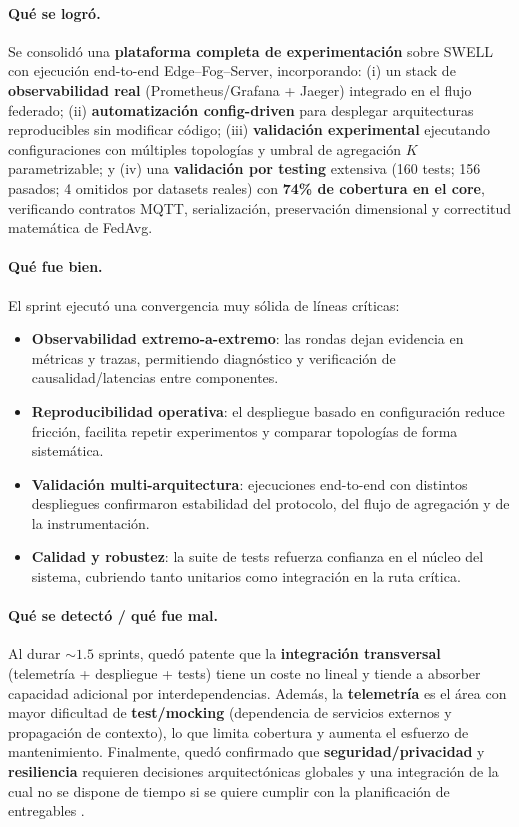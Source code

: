 \documentclass{report}
\begin{document}
\vspace{0.15em}
\paragraph{Qué se logró.}
Se consolidó una \textbf{plataforma completa de experimentación} sobre SWELL con ejecución end-to-end Edge--Fog--Server, incorporando:
(i) un stack de \textbf{observabilidad real} (Prometheus/Grafana + Jaeger) integrado en el flujo federado;
(ii) \textbf{automatización config-driven} para desplegar arquitecturas reproducibles sin modificar código;
(iii) \textbf{validación experimental} ejecutando configuraciones con múltiples topologías y umbral de agregación $K$ parametrizable; y
(iv) una \textbf{validación por testing} extensiva (160 tests; 156 pasados; 4 omitidos por datasets reales) con \textbf{74\% de cobertura en el core}, verificando contratos MQTT, serialización, preservación dimensional y correctitud matemática de FedAvg.

\vspace{0.15em}
\paragraph{Qué fue bien.}
El sprint ejecutó una convergencia muy sólida de líneas críticas:
\begin{itemize}\setlength\itemsep{0.25em}
  \item \textbf{Observabilidad extremo-a-extremo}: las rondas dejan evidencia en métricas y trazas, permitiendo diagnóstico y verificación de causalidad/latencias entre componentes.
  \item \textbf{Reproducibilidad operativa}: el despliegue basado en configuración reduce fricción, facilita repetir experimentos y comparar topologías de forma sistemática.
  \item \textbf{Validación multi-arquitectura}: ejecuciones end-to-end con distintos despliegues confirmaron estabilidad del protocolo, del flujo de agregación y de la instrumentación.
  \item \textbf{Calidad y robustez}: la suite de tests refuerza confianza en el núcleo del sistema, cubriendo tanto unitarios como integración en la ruta crítica.
\end{itemize}

\vspace{0.15em}
\paragraph{Qué se detectó / qué fue mal.}
Al durar $\sim 1.5$ sprints, quedó patente que la \textbf{integración transversal} (telemetría + despliegue + tests) tiene un coste no lineal y tiende a absorber capacidad adicional por interdependencias. Además, la \textbf{telemetría} es el área con mayor dificultad de \textbf{test/mocking} (dependencia de servicios externos y propagación de contexto), lo que limita cobertura y aumenta el esfuerzo de mantenimiento.
Finalmente, quedó confirmado que \textbf{seguridad/privacidad} y \textbf{resiliencia} requieren decisiones arquitectónicas globales y una integración de la cual no se dispone de tiempo si se quiere cumplir con la planificación de entregables \cite{sec:planificacion} .
\end{document}
